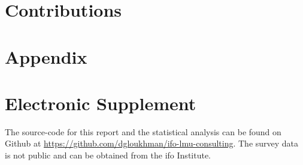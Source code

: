 \documentclass[12pt]{article}
\theoremstyle{plain}
\theoremstyle{definition}
\begin{document}
\section{Contributions}
\label{ch:contributions}

\newpage

\section{Appendix}
\label{ch:appendix}

\newpage


\setcounter{page}{4} %


\clearpage




\clearpage

\section{Electronic Supplement}
The source-code for this report and the statistical analysis can be found on Github at \href{https://github.com/dgloukhman/ifo-lmu-consulting}{https://github.com/dgloukhman/ifo-lmu-consulting}. The survey data is not public and can be obtained from the ifo Institute. 
\end{document}
